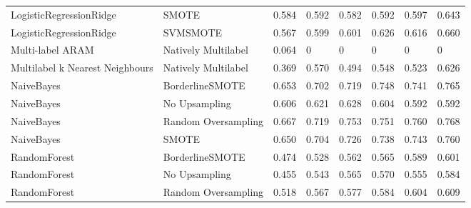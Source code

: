 \begin{tabular}{llllllll}
        LogisticRegressionRidge &                         SMOTE & 0.584 &                     0.592 &                 0.582 &                  0.592 &                                   0.597 &    0.643 \\
        LogisticRegressionRidge &                      SVMSMOTE & 0.567 &                     0.599 &                 0.601 &                  0.626 &                                   0.616 &    0.660 \\
               Multi-label ARAM &           Natively Multilabel & 0.064 &                         0 &                     0 &                      0 &                                       0 &        0 \\
Multilabel k Nearest Neighbours &           Natively Multilabel & 0.369 &                     0.570 &                 0.494 &                  0.548 &                                   0.523 &    0.626 \\
                     NaiveBayes &               BorderlineSMOTE & 0.653 &                     0.702 &                 0.719 &                  0.748 &                                   0.741 &    0.765 \\
                     NaiveBayes &                 No Upsampling & 0.606 &                     0.621 &                 0.628 &                  0.604 &                                   0.592 &    0.592 \\
                     NaiveBayes &           Random Oversampling & 0.667 &                     0.719 &                 0.753 &                  0.751 &                                   0.760 &    0.768 \\
                     NaiveBayes &                         SMOTE & 0.650 &                     0.704 &                 0.726 &                  0.738 &                                   0.743 &    0.760 \\
                   RandomForest &               BorderlineSMOTE & 0.474 &                     0.528 &                 0.562 &                  0.565 &                                   0.589 &    0.601 \\
                   RandomForest &                 No Upsampling & 0.455 &                     0.543 &                 0.565 &                  0.570 &                                   0.555 &    0.584 \\
                   RandomForest &           Random Oversampling & 0.518 &                     0.567 &                 0.577 &                  0.584 &                                   0.604 &    0.609 \\

\end{tabular}
